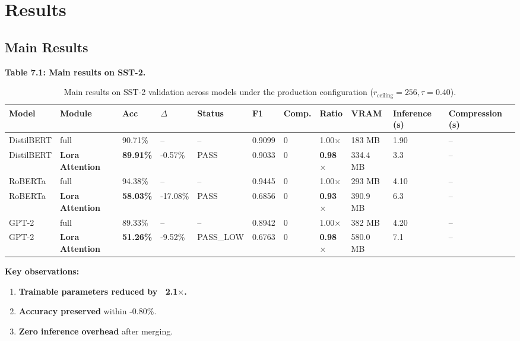 \section{Results}

\subsection{Main Results}

\textbf{Table 7.1: Main results on SST-2.}

\begin{table}[t]
\centering
\small
\begin{tabular}{lllllllllll}
\toprule
\textbf{Model} & \textbf{Module} & \textbf{Acc} & \textbf{$\Delta$} & \textbf{Status} & \textbf{F1} & \textbf{Comp.} & \textbf{Ratio} & \textbf{VRAM} & \textbf{Inference (s)} & \textbf{Compression (s)} \\
\midrule
DistilBERT & full & 90.71\% & -- & -- & 0.9099 & 0 & 1.00$\times$ & 183 MB & 1.90 & -- \\
DistilBERT & \textbf{Lora Attention} & \textbf{89.91\%} & -0.57\% & PASS & 0.9033 & 0 & \textbf{0.98$\times$} & 334.4 MB & 3.3 & -- \\
RoBERTa & full & 94.38\% & -- & -- & 0.9445 & 0 & 1.00$\times$ & 293 MB & 4.10 & -- \\
RoBERTa & \textbf{Lora Attention} & \textbf{58.03\%} & -17.08\% & PASS & 0.6856 & 0 & \textbf{0.93$\times$} & 390.9 MB & 6.3 & -- \\
GPT-2 & full & 89.33\% & -- & -- & 0.8942 & 0 & 1.00$\times$ & 382 MB & 4.20 & -- \\
GPT-2 & \textbf{Lora Attention} & \textbf{51.26\%} & -9.52\% & PASS_LOW & 0.6763 & 0 & \textbf{0.98$\times$} & 580.0 MB & 7.1 & -- \\
\bottomrule
\end{tabular}
\caption{Main results on SST-2 validation across models under the production configuration ($r_{\mathrm{ceiling}}=256, \tau=0.40$).}
\label{tab:main_sst2}
\end{table}

\textbf{Key observations:}

\begin{enumerate}
\item \textbf{Trainable parameters reduced by ~2.1$\times$.}
\item \textbf{Accuracy preserved} within -0.80\%.
\item \textbf{Zero inference overhead} after merging.

\end{enumerate}
